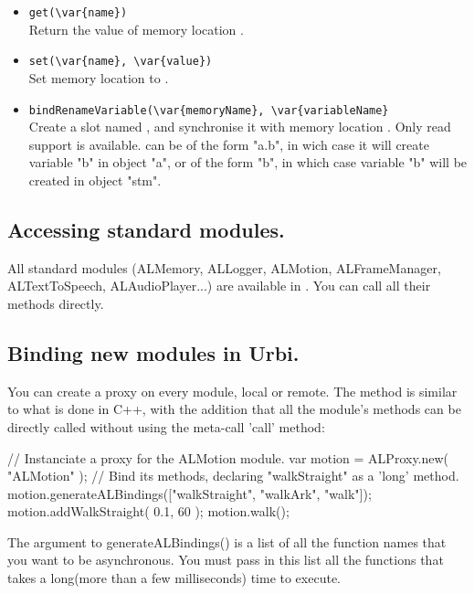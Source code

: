 \begin{itemize}
\item \lstinline|get(\var{name})| \\
  Return the value of memory location .
\item \lstinline|set(\var{name}, \var{value})| \\
  Set memory location  to .
\item \lstinline|bindRenameVariable(\var{memoryName}, \var{variableName}| \\
  Create a \us slot named , and synchronise it with memory
  location . Only read support is available.
   can be of the form "a.b", in wich case it will create
  variable "b" in object "a", or of the form "b", in which case variable "b"
  will be created in object "stm".
\end{itemize}

\subsection{Accessing standard \naoqi modules.}

All standard \naoqi modules (ALMemory, ALLogger, ALMotion, ALFrameManager,
ALTextToSpeech, ALAudioPlayer...) are available in \urbi. You can call all
their methods directly.

\subsection{Binding new \naoqi modules in Urbi.}

You can create a proxy on every \naoqi module, local or remote.
The method is similar to what is done in C++, with the addition that all the
module's methods can be directly called without using the meta-call 'call'
method:

\begin{urbifixme}
// Instanciate a proxy for the ALMotion module.
var motion = ALProxy.new( "ALMotion" );
// Bind its methods, declaring "walkStraight" as a 'long' method.
motion.generateALBindings(["walkStraight", "walkArk", "walk"]);
motion.addWalkStraight( 0.1, 60 );
motion.walk();
\end{urbifixme}

The argument to generateALBindings() is a list of all the function
names that you want to be asynchronous. You must pass in this list
all the functions that takes a long(more than a few milliseconds)
time to execute.

